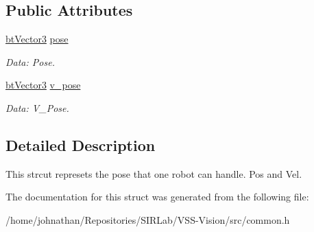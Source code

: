 \subsection*{Public Attributes}
\begin{DoxyCompactItemize}
\item 
\hyperlink{structcommon_1_1btVector3}{bt\+Vector3} \hyperlink{structcommon_1_1Robot_a31960c8ccd21cde1ca66e263851b83ad}{pose}\hypertarget{structcommon_1_1Robot_a31960c8ccd21cde1ca66e263851b83ad}{}\label{structcommon_1_1Robot_a31960c8ccd21cde1ca66e263851b83ad}

\begin{DoxyCompactList}\small\item\em Data\+: Pose. \end{DoxyCompactList}\item 
\hyperlink{structcommon_1_1btVector3}{bt\+Vector3} \hyperlink{structcommon_1_1Robot_a8114313ba162326a4cb51ce4d5c992f2}{v\+\_\+pose}\hypertarget{structcommon_1_1Robot_a8114313ba162326a4cb51ce4d5c992f2}{}\label{structcommon_1_1Robot_a8114313ba162326a4cb51ce4d5c992f2}

\begin{DoxyCompactList}\small\item\em Data\+: V\+\_\+\+Pose. \end{DoxyCompactList}\end{DoxyCompactItemize}


\subsection{Detailed Description}
This strcut represets the pose that one robot can handle. Pos and Vel. 

The documentation for this struct was generated from the following file\+:\begin{DoxyCompactItemize}
\item 
/home/johnathan/\+Repositories/\+S\+I\+R\+Lab/\+V\+S\+S-\/\+Vision/src/common.\+h\end{DoxyCompactItemize}
